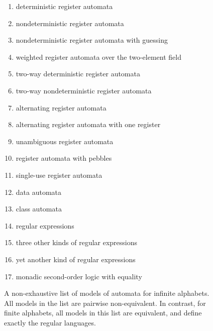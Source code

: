 \begin{figure}
    \begin{enumerate}
    \item deterministic register automata~\cite[Definition 3]{kaminskiFiniteMemoryAutomata1994}
    \item nondeterministic register automata~\cite[Definition 1]{kaminskiFiniteMemoryAutomata1994}
    \item nondeterministic register automata with guessing~\cite[Definition 2.7]{bojanczyk_slightly}
    \item weighted register automata over the two-element field~\cite[Definition 3.1]{orbitFiniteVectorTheoretics}
    \item two-way deterministic register automata~\cite[Definition 5]{kaminskiFiniteMemoryAutomata1994}
    \item two-way nondeterministic register automata~\cite[Definition 2.1]{nevenFiniteStateMachines2004}
    \item alternating register automata~\cite[p.~16:8]{lazicDemri09}
    \item alternating register automata with one register~\cite[p.~16:19]{lazicDemri09}
    \item \label{it:orbit-finite-unamb} unambiguous register automata~\cite[Section 5]{colcombet2015unambiguity}
    \item register automata with pebbles~\cite[Section 2.2]{nevenFiniteStateMachines2004}
    \item \label{it:single-use} single-use register automata~\cite[Definition 2]{bojanczykstefanski2020}
    \item data automata~\cite[Section 4.2]{bojanczykTwovariableLogicData2011}
    \item class automata~\cite[Section III]{bojanczykExtensionDataAutomata2010} 
    \item regular expressions~\cite[Definition 2]{regexpKaminskiTan2004}
    \item three other kinds of regular expressions~\cite[Sections 4, 5, 6]{regexpLibkin2015}
    \item yet another kind of regular expressions~\cite[Section 5]{KleeneNominal2019}
    \item monadic second-order logic with equality~\cite[Section 2.4]{nevenFiniteStateMachines2004}
\end{enumerate}
    \caption{A non-exhaustive list of models of automata for infinite alphabets. All models in the list are pairwise non-equivalent. In contrast, for finite alphabets, all models in this list are equivalent, and define exactly the regular languages. }
    \label{fig:automata-infinite-alphabets}
\end{figure}





